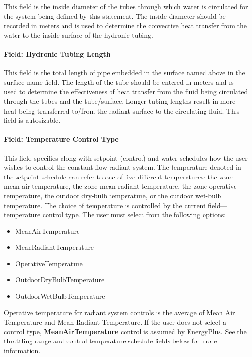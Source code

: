 This field is the inside diameter of the tubes through which water is circulated for the system being defined by this statement. The inside diameter should be recorded in meters and is used to determine the convective heat transfer from the water to the inside surface of the hydronic tubing.

\paragraph{Field: Hydronic Tubing Length}\label{field-hydronic-tubing-length-1}

This field is the total length of pipe embedded in the surface named above in the surface name field. The length of the tube should be entered in meters and is used to determine the effectiveness of heat transfer from the fluid being circulated through the tubes and the tube/surface. Longer tubing lengths result in more heat being transferred to/from the radiant surface to the circulating fluid. This field is autosizable.

\paragraph{Field: Temperature Control Type}\label{field-temperature-control-type-1}

This field specifies along with setpoint (control) and water schedules how the user wishes to control the constant flow radiant system. The temperature denoted in the setpoint schedule can refer to one of five different temperatures: the zone mean air temperature, the zone mean radiant temperature, the zone operative temperature, the outdoor dry-bulb temperature, or the outdoor wet-bulb temperature. The choice of temperature is controlled by the current field---temperature control type. The user must select from the following options:

\begin{itemize}
\item
  MeanAirTemperature
\item
  MeanRadiantTemperature
\item
  OperativeTemperature
\item
  OutdoorDryBulbTemperature
\item
  OutdoorWetBulbTemperature
\end{itemize}

Operative temperature for radiant system controls is the average of Mean Air Temperature and Mean Radiant Temperature. If the user does not select a control type, \textbf{MeanAirTemperature} control is assumed by EnergyPlus. See the throttling range and control temperature schedule fields below for more information.


